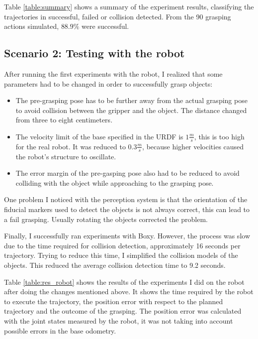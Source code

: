 Table \ref{table:summary} shows a summary of the experiment results, classifying the trajectories in successful, failed or collision detected. From the 90 grasping actions simulated, $88.9\%$ were successful.

\subsection{Scenario 2: Testing with the robot}

After running the first experiments with the robot, I realized that some parameters had to be changed in order to successfully grasp objects:
\begin{itemize}
	\item The pre-grasping pose has to be further away from the actual grasping pose to avoid collision between the gripper and the object. The distance changed from three to eight centimeters.
	\item The velocity limit of the base specified in the URDF is  $1\frac{m}{s}$, this is too high for the real robot. It was reduced to $0.3\frac{m}{s}$, because higher velocities caused the robot's structure to oscillate.
	\item The error margin of the pre-gasping pose also had to be reduced to avoid colliding with the object while approaching to the grasping pose.
\end{itemize}

One problem I noticed with the perception system is that the orientation of the fiducial markers used to detect the objects is not always correct, this can lead to a fail grasping. Usually rotating the objects corrected the problem.

Finally, I successfully ran experiments with Boxy. However, the process was slow due to the time required for collision detection, approximately 16 seconds per trajectory. Trying to reduce this time, I simplified the collision models of the objects. This reduced the average collision detection time to 9.2 seconds.

Table \ref{table:res_robot}  shows the results of the experiments I did on the robot after doing the changes mentioned above. It shows the time required by the robot to execute the trajectory, the position error with respect to the planned trajectory and the outcome of the grasping. The position error was calculated with the joint states measured by the robot, it was not taking into account possible errors in the base odometry.
 \vspace{1cm}

